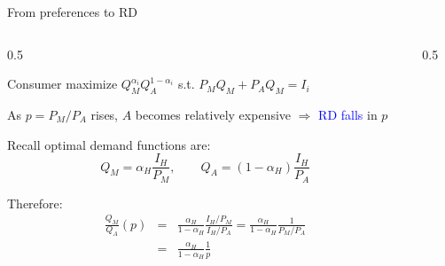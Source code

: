 \documentclass[notes,11pt, aspectratio=169, xcolor=table]{beamer}
\newcommand{\blue}[1]{\textcolor{blue}{#1}}
\newenvironment{wideitemize}{\itemize\addtolength{\itemsep}{10pt}}{\enditemize}
\begin{document}
\begin{frame}{From preferences to RD}
\begin{columns}[T]
\begin{column}{0.5\textwidth}
\begin{wideitemize}
  \item Consumer maximize $Q_{M}^{\alpha_i}Q_{A}^{1-\alpha_i}$ s.t. $P_M Q_M + P_A Q_M  = I_i$
  \item<2-> As $p = P_M/P_A$ rises, $A$ becomes relatively expensive $\Rightarrow$ \blue{RD falls} in $p$
  \item<3-> Recall optimal demand functions are:
  \begin{equation*}
      Q_{M} = \alpha_H \frac{I_H}{P_M}, \qquad       Q_{A} = (1-\alpha_H) \frac{I_H}{P_A} 
  \end{equation*}
  \item<4-> Therefore:
  \begin{eqnarray*}
      \frac{Q_{M}}{Q_{A}}(p) &=& \frac{\alpha_H}{1-\alpha_H} \frac{I_H/P_M}{I_H/P_A} = \frac{\alpha_H}{1-\alpha_H} \frac{1}{P_M/P_A} \\
      &=&   \frac{\alpha_H}{1-\alpha_H} \frac{1}{p}
  \end{eqnarray*}
  
\end{wideitemize}
\end{column}
\begin{column}{0.5\textwidth}
\centering
\end{column}
\end{columns}
\end{frame}
\end{document}
